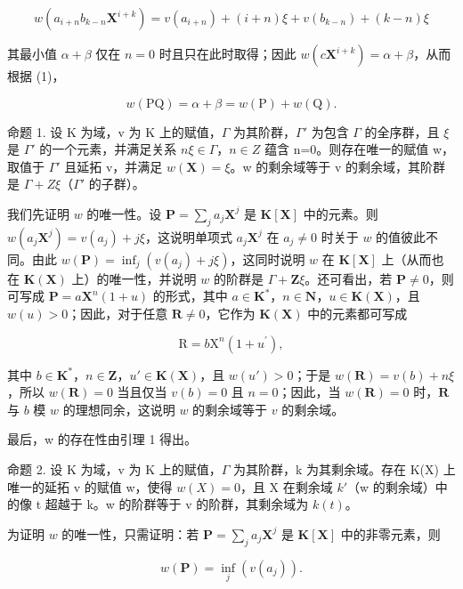 \[
w (a _ {i + n} b _ {k - n} \mathbf {X} ^ {i + k}) = v (a _ {i + n}) + (i + n) \xi + v (b _ {k - n}) + (k - n) \xi
\]

其最小值 \(\alpha + \beta\) 仅在 \(n = 0\) 时且只在此时取得；因此 \(w(c\mathbf{X}^{i + k}) = \alpha + \beta\)，从而根据 (1)，

\[
w (\mathrm{PQ}) = \alpha + \beta = w (\mathrm{P}) + w (\mathrm{Q}).
\]

命题 1. 设 K 为域，v 为 K 上的赋值，\(\Gamma\) 为其阶群，\(\Gamma'\) 为包含 \(\Gamma\) 的全序群，且 \(\xi\) 是 \(\Gamma'\) 的一个元素，并满足关系 \(n\xi\in\Gamma\)，\(n\in Z\) 蕴含 n=0。则存在唯一的赋值 w，取值于 \(\Gamma'\) 且延拓 v，并满足 \(w(\mathbf{X})=\xi\)。w 的剩余域等于 v 的剩余域，其阶群是 \(\Gamma+Z\xi\)（\(\Gamma'\) 的子群）。

我们先证明 \(w\) 的唯一性。设 \(\mathbf{P} = \sum_{j} a_j \mathbf{X}^j\) 是 \(\mathbf{K}[\mathbf{X}]\) 中的元素。则 \(w(a_j \mathbf{X}^j) = v(a_j) + j\xi\)，这说明单项式 \(a_j \mathbf{X}^j\) 在 \(a_j \neq 0\) 时关于 \(w\) 的值彼此不同。由此 \(w(\mathbf{P}) = \inf_j (v(a_j) + j\xi)\)，这同时说明 \(w\) 在 \(\mathbf{K}[\mathbf{X}]\) 上（从而也在 \(\mathbf{K}(\mathbf{X})\) 上）的唯一性，并说明 \(w\) 的阶群是 \(\Gamma + \mathbf{Z}\xi\)。还可看出，若 \(\mathbf{P} \neq 0\)，则可写成 \(\mathbf{P} = a\mathbf{X}^n (1 + u)\) 的形式，其中 \(a\in \mathbf{K}^*\)，\(n\in \mathbf{N}\)，\(u\in \mathbf{K}(\mathbf{X})\)，且 \(w(u) > 0\)；因此，对于任意 \(\mathbf{R}\neq 0\)，它作为 \(\mathbf{K}(\mathbf{X})\) 中的元素都可写成

\[
\mathrm{R} = b \mathrm{X} ^ {n} (1 + u ^ {\prime}),
\]

其中 \(b \in \mathbf{K}^*\)，\(n \in \mathbf{Z}\)，\(u' \in \mathbf{K}(\mathbf{X})\)，且 \(w(u') > 0\)；于是 \(w(\mathbf{R}) = v(b) + n\xi\)，所以 \(w(\mathbf{R}) = 0\) 当且仅当 \(v(b) = 0\) 且 \(n = 0\)；因此，当 \(w(\mathbf{R}) = 0\) 时，\(\mathbf{R}\) 与 \(b\) 模 \(w\) 的理想同余，这说明 \(w\) 的剩余域等于 \(v\) 的剩余域。

最后，w 的存在性由引理 1 得出。

命题 2. 设 K 为域，v 为 K 上的赋值，\(\Gamma\) 为其阶群，k 为其剩余域。存在 K(X) 上唯一的延拓 v 的赋值 w，使得 \(w(X) = 0\)，且 X 在剩余域 \(k'\)（w 的剩余域）中的像 t 超越于 k。w 的阶群等于 v 的阶群，其剩余域为 \(k(t)\)。

为证明 \(w\) 的唯一性，只需证明：若 \(\mathbf{P} = \sum_{j} a_j \mathbf{X}^j\) 是 \(\mathbf{K}[\mathbf{X}]\) 中的非零元素，则

\[
w (\mathbf {P}) = \inf _ {j} (v (a _ {j})).
\]

